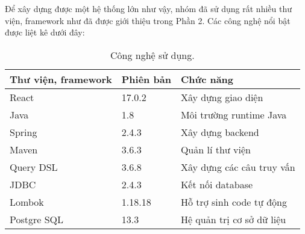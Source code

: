 Để xây dựng được một hệ thống lớn như vậy, nhóm đã sử dụng rất nhiều thư viện, framework như đã được giới thiệu trong Phần 2. Các công nghệ nổi bật được liệt kê dưới đây:

\begin{table}[h]
    \centering
    \begin{tabular}{|m{4cm}|m{2cm}|m{4cm}|}
    \hline 
        \textbf{Thư viện, framework} & \textbf{Phiên bản} & \textbf{Chức năng}\\ \hline
        React & 17.0.2 & Xây dựng giao diện \\ \hline
        Java & 1.8 & Môi trường runtime Java \\ \hline
        Spring & 2.4.3 & Xây dựng backend \\ \hline
        Maven & 3.6.3 & Quản lí thư viện \\ \hline
        Query DSL & 3.6.8 & Xây dựng các câu truy vấn \\ \hline
        JDBC & 2.4.3 & Kết nối database \\ \hline
        Lombok & 1.18.18 & Hỗ trợ sinh code tự động \\ \hline
        Postgre SQL & 13.3 & Hệ quản trị cơ sở dữ liệu \\ \hline
    \end{tabular}
    \caption{Công nghệ sử dụng.}
    \label{usedtech}
\end{table}